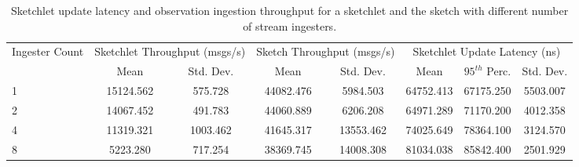 \begin{table}[h!]
    \renewcommand{\arraystretch}{1.3}
    \caption{Sketchlet update latency and observation ingestion throughput for a sketchlet and the sketch with different number of stream ingesters.}
    \label{tab:throughput}
    \begin{center}
        \begin{tabularx}{0.9\textwidth}{|X|c|c|c|c|c|c|c|}
            \hline
            \multirow{2}{*}{Ingester Count} & \multicolumn{2}{c|}{\cellcolor[gray]{0.7}Sketchlet Throughput (msgs/s)} &\multicolumn{2}{c|}{\cellcolor[gray]{0.7}Sketch Throughput (msgs/s)} & \multicolumn{3}{c|}{\cellcolor[gray]{0.7}Sketchlet Update Latency (ns)} \\
            \cline{2-5}
             & \cellcolor[gray]{0.9}Mean & \cellcolor[gray]{0.9}Std. Dev.  &  \cellcolor[gray]{0.9}Mean & \cellcolor[gray]{0.9}Std. Dev.
             &  \cellcolor[gray]{0.9}Mean & \cellcolor[gray]{0.9}$95^{th}$ Perc. & \cellcolor[gray]{0.9}Std. Dev. \\
            \hline
            1 & 15124.562 & 575.728 & 44082.476 & 5984.503 & 64752.413 & 67175.250 & 5503.007 \\
            \hline
            2 & 14067.452 & 491.783 & 44060.889 & 6206.208 & 64971.289 & 71170.200 & 4012.358 \\
            \hline
            4 & 11319.321 & 1003.462 & 41645.317 & 13553.462 & 74025.649 & 78364.100 & 3124.570 \\
            \hline
            8 & 5223.280 & 717.254 & 38369.745 & 14008.308 & 81034.038 & 85842.400 & 2501.929 \\
            \hline
        \end{tabularx}
    \end{center}
\end{table}
%
%
